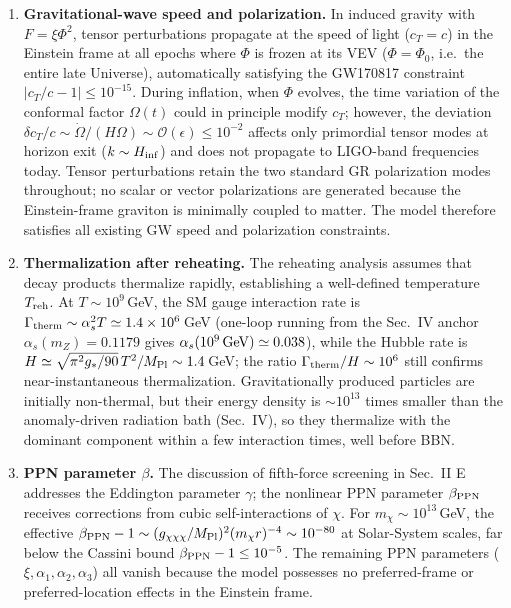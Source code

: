 \documentclass[pdflatex,sn-mathphys-num]{sn-jnl}
\newcommand{\MP}{M_{\rm Pl}}
\newcommand{\PhiV}{\Phi_0}
\theoremstyle{thmstyleone}
\begin{document}
\begin{enumerate}
\item \textbf{Gravitational-wave speed and polarization.} In induced gravity with $F=\xi\Phi^2$, tensor perturbations propagate at the speed of light ($c_T=c$) in the Einstein frame at all epochs where $\Phi$ is frozen at its VEV ($\Phi=\PhiV$, i.e.\ the entire late Universe), automatically satisfying the GW170817 constraint $|c_T/c-1|\leq10^{-15}$. During inflation, when $\Phi$ evolves, the time variation of the conformal factor $\Omega(t)$ could in principle modify $c_T$; however, the deviation $\delta c_T/c\sim\dot\Omega/(H\Omega)\sim\mathcal{O}(\epsilon)\leq10^{-2}$ affects only primordial tensor modes at horizon exit ($k\sim H_{\rm inf}$) and does not propagate to LIGO-band frequencies today. Tensor perturbations retain the two standard GR polarization modes throughout; no scalar or vector polarizations are generated because the Einstein-frame graviton is minimally coupled to matter. The model therefore satisfies all existing GW speed and polarization constraints.

\item \textbf{Thermalization after reheating.} The reheating analysis assumes that decay products thermalize rapidly, establishing a well-defined temperature $T_{\rm reh}$. At $T\sim10^9\,$GeV, the SM gauge interaction rate is $\Gamma_{\rm therm}\sim\alpha_s^2 T\simeq1.4\times10^{6}\,$GeV (one-loop running from the Sec.~IV anchor $\alpha_s(m_Z)=0.1179$ gives $\alpha_s(10^{9}\,{\rm GeV})\simeq0.038$), while the Hubble rate is $H\simeq\sqrt{\pi^2 g_*/90}\,T^2/\MP\sim1.4\,$GeV; the ratio $\Gamma_{\rm therm}/H\sim10^{6}$ still confirms near-instantaneous thermalization. Gravitationally produced particles are initially non-thermal, but their energy density is $\sim10^{13}$ times smaller than the anomaly-driven radiation bath (Sec.~IV), so they thermalize with the dominant component within a few interaction times, well before BBN.

\item \textbf{PPN parameter $\beta$.} The discussion of fifth-force screening in Sec.~II E addresses the Eddington parameter $\gamma$; the nonlinear PPN parameter $\beta_{\rm PPN}$ receives corrections from cubic self-interactions of $\chi$. For $m_\chi\sim10^{13}\,$GeV, the effective $\beta_{\rm PPN}-1\sim(g_{\chi\chi\chi}/\MP)^2(m_\chi r)^{-4}\sim10^{-80}$ at Solar-System scales, far below the Cassini bound $\beta_{\rm PPN}-1\leq10^{-5}$. The remaining PPN parameters ($\xi,\alpha_1,\alpha_2,\alpha_3$) all vanish because the model possesses no preferred-frame or preferred-location effects in the Einstein frame.


\end{enumerate}
\end{document}
